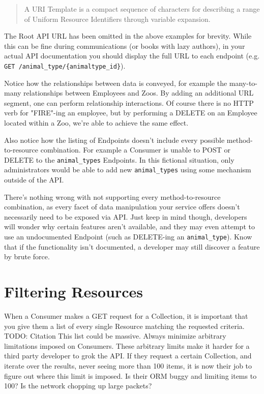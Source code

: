 \documentclass{book}
\begin{document}
\begin{quote}
A URI Template is a compact sequence of characters for describing a range of Uniform Resource Identifiers through variable expansion.\cite{RFC6570}
\end{quote}

The Root API URL has been omitted in the above examples for brevity. While this can be fine during communications (or books with lazy authors), in your actual API documentation you should display the full URL to each endpoint (e.g. \texttt{GET /animal\_type/\{animaltype\_id\}}).

Notice how the relationships between data is conveyed, for example the many-to-many relationships between Employees and Zoos. By adding an additional URL segment, one can perform relationship interactions. Of course there is no HTTP verb for "FIRE"-ing an employee, but by performing a DELETE on an Employee located within a Zoo, we're able to achieve the same effect.

Also notice how the listing of Endpoints doesn't include every possible method-to-resource combination. For example a Consumer is unable to POST or DELETE to the \texttt{animal\_types} Endpoints. In this fictional situation, only administrators would be able to add new \texttt{animal\_types} using some mechanism outside of the API.

There's nothing wrong with not supporting every method-to-resource combination, as every facet of data manipulation your service offers doesn't necessarily need to be exposed via API. Just keep in mind though, developers will wonder why certain features aren't available, and they may even attempt to use an undocumented Endpoint (such as DELETE-ing an \texttt{animal\_type}). Know that if the functionality isn't documented, a developer may still discover a feature by brute force.


\section{Filtering Resources}

When a Consumer makes a GET request for a Collection, it is important that you give them a list of every single Resource matching the requested criteria. TODO: Citation This list could be massive. Always minimize arbitrary limitations imposed on Consumers. These arbitrary limits make it harder for a third party developer to grok the API. If they request a certain Collection, and iterate over the results, never seeing more than 100 items, it is now their job to figure out where this limit is imposed. Is their ORM buggy and limiting items to 100? Is the network chopping up large packets?
\end{document}
